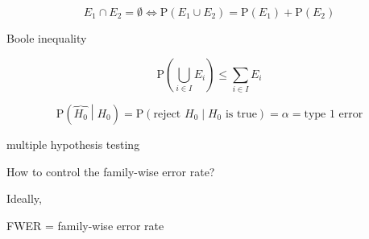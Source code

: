 \documentclass[
]{book}
\theoremstyle{definition}
\theoremstyle{definition}
\theoremstyle{definition}
\theoremstyle{definition}
\theoremstyle{remark}
\begin{document}
\[
E_{{\scriptscriptstyle 1}}\cap E_{{\scriptscriptstyle 2}}=\emptyset\Leftrightarrow\mathrm{P}\left(E_{{\scriptscriptstyle 1}}\cup E_{{\scriptscriptstyle 2}}\right)=\mathrm{P}\left(E_{{\scriptscriptstyle 1}}\right)+\mathrm{P}\left(E_{{\scriptscriptstyle 2}}\right)
\]

Boole inequality

\[
\mathrm{P}\left(\bigcup\limits _{i\in I}E_{{\scriptscriptstyle i}}\right)\le\sum\limits _{i\in I}E_{{\scriptscriptstyle i}}
\]

\[
\mathrm{P}\left(\overbrace{H_{{\scriptscriptstyle 0}}}\middle|H_{{\scriptscriptstyle 0}}\right)=\mathrm{P}\left(\text{reject }H_{{\scriptscriptstyle 0}}\middle|H_{{\scriptscriptstyle 0}}\text{ is true}\right)=\alpha=\text{type 1 error}
\]

multiple hypothesis testing

How to control the family-wise error rate?

Ideally,

FWER = family-wise error rate
\end{document}
